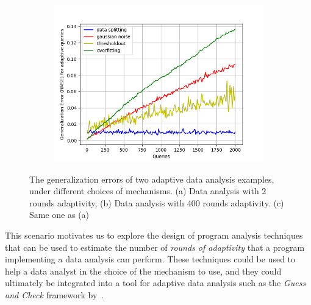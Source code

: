 {\begin{figure}
\begin{subfigure}{.322\textwidth}
\begin{centering}
\caption{}
\end{centering}
\end{subfigure}
\begin{subfigure}{.322\textwidth}
\begin{centering}
\includegraphics[width=1.0\textwidth]{twoRounds-rmse-fourmechs.png}
\caption{}
\end{centering}
\end{subfigure}
\vspace{-0.2cm}
 \caption{
 The generalization errors of two adaptive data analysis examples, under different choices of mechanisms.
 (a) Data analysis with 2 rounds adaptivity, 
 (b) Data analysis with 400 rounds adaptivity.
 (c) Same one as (a)
}
\label{fig:generalization_errors}
\vspace{-0.6cm}
\end{figure}
}

This scenario motivates us to explore the design of program analysis techniques that can be used to estimate the number of \emph{rounds of adaptivity} that a program implementing a data analysis can perform. These techniques could be used to help a data analyst in the choice of the mechanism to use,
and they
could ultimately be integrated into a tool for adaptive data analysis such as the \emph{Guess and Check} framework by~\citet{RogersRSSTW20}. 

